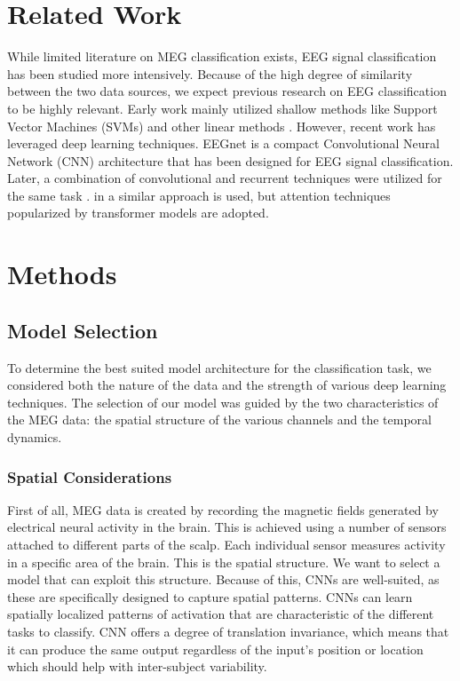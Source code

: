 \documentclass[conference]{IEEEtran}
\begin{document}
\section{Related Work}
While limited literature on MEG classification exists, EEG signal classification has been studied more intensively. Because of the
high degree of similarity between the two data sources, we expect previous research on EEG classification to be highly relevant.
Early work mainly utilized shallow methods like Support Vector Machines (SVMs) and other linear methods \cite{besserve2007classification}.
However, recent work \cite{lawhern2018eegnet} \cite{zhang2018cascade} \cite{abdellaoui2020deepbrainstateclassification}  has leveraged deep learning
techniques. EEGnet \cite{lawhern2018eegnet} is a compact Convolutional Neural Network (CNN) architecture  that has been designed for EEG signal classification. 
 Later, a combination of convolutional and recurrent techniques were utilized for the same task \cite{zhang2018cascade}. in \cite{abdellaoui2020deepbrainstateclassification} a similar approach is used,
but attention techniques popularized by transformer models \cite{vaswani2017attention} are adopted. 

\section{Methods}

\subsection{Model Selection}
To determine the best suited model architecture for the classification task, we considered both the nature of the data and the strength of various deep learning techniques.
 The selection of our model was guided by the two characteristics of the MEG data: the spatial structure of the various channels and the temporal dynamics.

\subsubsection{Spatial Considerations}
First of all, MEG data is created by recording the magnetic fields generated by electrical neural activity in the brain.
 This is achieved using a number of sensors attached to different parts of the scalp. Each individual sensor measures activity 
 in a specific area of the brain. This is the spatial structure. We want to select a model that can exploit this structure.
  Because of this, CNNs are well-suited, as these are specifically designed to capture spatial patterns.
CNNs can learn spatially localized patterns of activation that are characteristic of the different tasks to classify. 
CNN offers a degree of translation invariance, which means that it can produce the same output regardless of the input's position or location which should help with inter-subject variability. 
\end{document}
